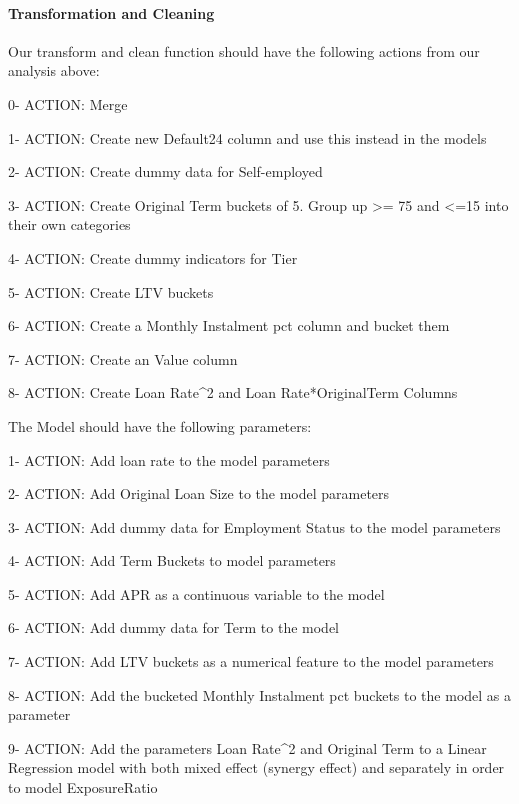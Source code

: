 \documentclass[11pt]{article}
\begin{document}
    \paragraph{Transformation and
Cleaning}\label{transformation-and-cleaning}

    Our transform and clean function should have the following actions from
our analysis above:

0- ACTION: Merge

1- ACTION: Create new Default24 column and use this instead in the
models

2- ACTION: Create dummy data for Self-employed

3- ACTION: Create Original Term buckets of 5. Group up \textgreater{}=
75 and \textless{}=15 into their own categories

4- ACTION: Create dummy indicators for Tier

5- ACTION: Create LTV buckets

6- ACTION: Create a Monthly Instalment pct column and bucket them

7- ACTION: Create an Value column

8- ACTION: Create Loan Rate\^{}2 and Loan Rate*OriginalTerm Columns

The Model should have the following parameters:

1- ACTION: Add loan rate to the model parameters

2- ACTION: Add Original Loan Size to the model parameters

3- ACTION: Add dummy data for Employment Status to the model parameters

4- ACTION: Add Term Buckets to model parameters

5- ACTION: Add APR as a continuous variable to the model

6- ACTION: Add dummy data for Term to the model

7- ACTION: Add LTV buckets as a numerical feature to the model
parameters

8- ACTION: Add the bucketed Monthly Instalment pct buckets to the model
as a parameter

9- ACTION: Add the parameters Loan Rate\^{}2 and Original Term to a
Linear Regression model with both mixed effect (synergy effect) and
separately in order to model ExposureRatio
\end{document}
